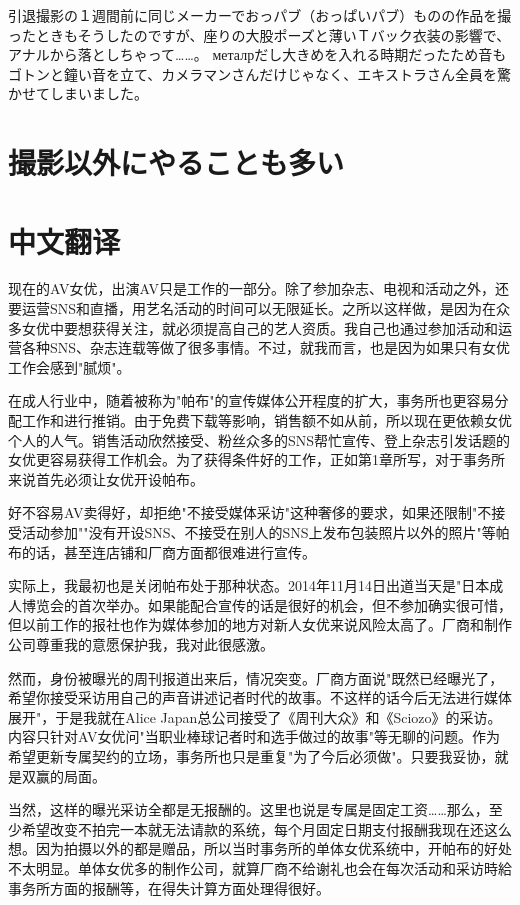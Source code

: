 \documentclass[12pt,UTF8]{ctexbook}
\begin{document}
引退撮影の１週間前に同じメーカーでおっパブ（おっぱいパブ）ものの作品を撮ったときもそうしたのですが、座りの大股ポーズと薄いＴバック衣装の影響で、アナルから落としちゃって……。 металрだし大きめを入れる時期だったため音もゴトンと鐘い音を立て、カメラマンさんだけじゃなく、エキストラさん全員を驚かせてしまいました。

\switchcolumn

\section{撮影以外にやることも多い}

\switchcolumn

\section*{中文翻译}

现在的AV女优，出演AV只是工作的一部分。除了参加杂志、电视和活动之外，还要运营SNS和直播，用艺名活动的时间可以无限延长。之所以这样做，是因为在众多女优中要想获得关注，就必须提高自己的艺人资质。我自己也通过参加活动和运营各种SNS、杂志连载等做了很多事情。不过，就我而言，也是因为如果只有女优工作会感到"腻烦"。

在成人行业中，随着被称为"帕布"的宣传媒体公开程度的扩大，事务所也更容易分配工作和进行推销。由于免费下载等影响，销售额不如从前，所以现在更依赖女优个人的人气。销售活动欣然接受、粉丝众多的SNS帮忙宣传、登上杂志引发话题的女优更容易获得工作机会。为了获得条件好的工作，正如第1章所写，对于事务所来说首先必须让女优开设帕布。

好不容易AV卖得好，却拒绝"不接受媒体采访"这种奢侈的要求，如果还限制"不接受活动参加""没有开设SNS、不接受在别人的SNS上发布包装照片以外的照片"等帕布的话，甚至连店铺和厂商方面都很难进行宣传。

实际上，我最初也是关闭帕布处于那种状态。2014年11月14日出道当天是"日本成人博览会的首次举办。如果能配合宣传的话是很好的机会，但不参加确实很可惜，但以前工作的报社也作为媒体参加的地方对新人女优来说风险太高了。厂商和制作公司尊重我的意愿保护我，我对此很感激。

然而，身份被曝光的周刊报道出来后，情况突变。厂商方面说"既然已经曝光了，希望你接受采访用自己的声音讲述记者时代的故事。不这样的话今后无法进行媒体展开"，于是我就在Alice Japan总公司接受了《周刊大众》和《Sciozo》的采访。内容只针对AV女优问"当职业棒球记者时和选手做过的故事"等无聊的问题。作为希望更新专属契约的立场，事务所也只是重复"为了今后必须做"。只要我妥协，就是双赢的局面。

当然，这样的曝光采访全都是无报酬的。这里也说是专属是固定工资……那么，至少希望改变不拍完一本就无法请款的系统，每个月固定日期支付报酬我现在还这么想。因为拍摄以外的都是赠品，所以当时事务所的单体女优系统中，开帕布的好处不太明显。单体女优多的制作公司，就算厂商不给谢礼也会在每次活动和采访時給事务所方面的报酬等，在得失计算方面处理得很好。
\end{document}

